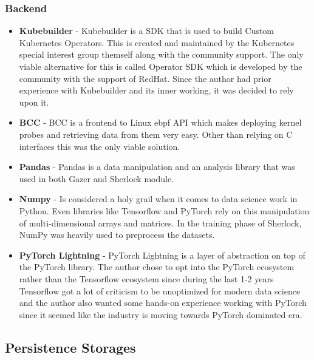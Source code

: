 \subsubsection{Backend}
\begin{itemize}
    \item \textbf{Kubebuilder} - Kubebuilder is a SDK that is used to build Custom Kubernetes Operators. This is created and maintained by the Kubernetes special interest group themself along with the community support. The only viable alternative for this is called Operator SDK which is developed by the community with the support of RedHat. Since the author had prior experience with Kubebuilder and its inner working, it was decided to rely upon it.
    \item \textbf{BCC} - BCC is a frontend to Linux \ac{ebpf} API which makes deploying kernel probes and retrieving data from them very easy. Other than relying on C interfaces this was the only viable solution. 
    \item \textbf{Pandas} - Pandas is a data manipulation and an analysis library that was used in both Gazer and Sherlock module.
    \item \textbf{Numpy} - Is considered a holy grail when it comes to data science work in Python. Even libraries like Tensorflow and PyTorch rely on this manipulation of multi-dimensional arrays and matrices. In the training phase of Sherlock, NumPy was heavily used to preprocess the datasets.
    \item \textbf{PyTorch Lightning} - PyTorch Lightning is a layer of abstraction on top of the PyTorch library. The author chose to opt into the PyTorch ecosystem rather than the Tensorflow ecosystem since during the last 1-2 years Tensorflow got a lot of criticism to be unoptimized for modern data science and the author also wanted some hands-on experience working with PyTorch since it seemed like the industry is moving towards PyTorch dominated era.
\end{itemize}

\subsection{Persistence Storages}

